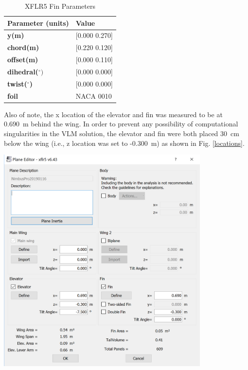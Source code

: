 \documentclass[]{auvsi_doc}
\begin{document}
\begin{table}[H]
	\centering
	\caption{XFLR5 Fin Parameters}
	\label{fin}
	\begin{tabular}{|P{3cm}|P{4.0cm}|}
		\hline
		{\color[HTML]{000000} \textbf{Parameter (units)}} & {\color[HTML]{000000}\textbf{Value}} \\
		\hline
		\textbf{y(m)} & [0.000 0.270] \\
		\hline
		\textbf{chord(m)} & [0.220 0.120]\\
		\hline
		\textbf{offset(m)} & [0.000 0.110] \\
		\hline
		\textbf{dihedral($^\circ)$} & [0.000 0.000] \\
		\hline
		\textbf{twist($^\circ$)} & [0.000 0.000] \\
		\hline
		\textbf{foil} & NACA 0010 \\
		\hline
	\end{tabular}
\end{table}

Also of note, the x location of the elevator and fin was measured to be at 0.690~m behind the wing. In order to prevent any possibility of computational singularities in the VLM solution, the elevator and fin were both placed 30~cm below the wing (i.e., z location was set to -0.300~m) as shown in Fig. \ref{locations}.

\begin{center}
	\includegraphics[width=0.80\textwidth]{./figs/wingLocations.png}
	\label{locations}
\end{center}
\end{document}
